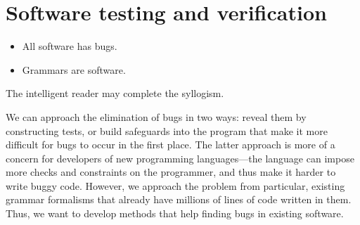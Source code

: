 \section{Software testing and verification}
\label{sec:testing-intro} 


\begin{itemize}
\item All software has bugs.
\item Grammars are software.
\end{itemize}

The intelligent reader may complete the syllogism.

We can approach the elimination of bugs in two ways: reveal them
by constructing tests, or build safeguards into the program that
make it more difficult for bugs to occur in the first place. The
latter approach is more of a concern for developers of new programming
languages---the language can impose more checks and constraints on the
programmer, and thus make it harder to write buggy code. However, we
approach the problem from particular, existing grammar formalisms that
already have millions of lines of code written in them. Thus, we want
to develop methods that help finding bugs in existing software.






